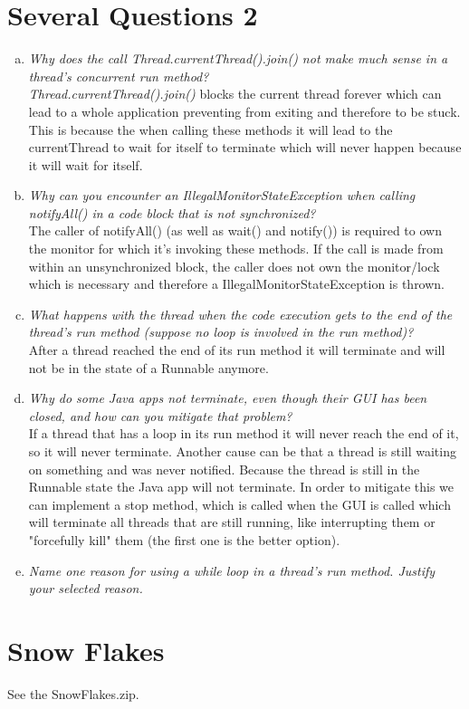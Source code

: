 \documentclass{report}
\begin{document}
	\section{Several Questions 2}
	\startsection
		\begin{enumerate}[a)]
			\item \textit{Why does the call Thread.currentThread().join() not make much sense in a thread’s concurrent run
method?} \\
			\textit{Thread.currentThread().join()} blocks the current thread forever which can lead to a whole application preventing from exiting and therefore to be stuck. This is because the when calling these methods it will lead to the currentThread to wait for itself to terminate which will never happen because it will wait for itself.
			\item \textit{Why can you encounter an IllegalMonitorStateException when calling notifyAll() in a code block
that is not synchronized?} \\
			The caller of notifyAll() (as well as wait() and notify()) is required to own the monitor for which it's invoking these methods. If the call is made from within an unsynchronized block, the caller does not own the monitor/lock which is necessary and therefore a IllegalMonitorStateException is thrown.
			\item \textit{What happens with the thread when the code execution gets to the end of the thread’s run method
(suppose no loop is involved in the run method)?} \\
			After a thread reached the end of its run method it will terminate and will not be in the state of a Runnable anymore.
			\item \textit{Why do some Java apps not terminate, even though their GUI has been closed, and how can you
mitigate that problem?} \\
			If a thread that has a loop in its run method it will never reach the end of it, so it will never terminate. Another cause can be that a thread is still waiting on something and was never notified. Because the thread is still in the Runnable state the Java app will not terminate. In order to mitigate this we can implement a stop method, which is called when the GUI is called which will terminate all threads that are still running, like interrupting them or "forcefully kill" them (the first one is the better option).
			\item \textit{Name one reason for using a while loop in a thread’s run method. Justify your selected reason.} \\
		\end{enumerate}
	\closesection
	
	\section{Snow Flakes}
	\startsection
		See the SnowFlakes.zip.
	\closesection
\end{document}
